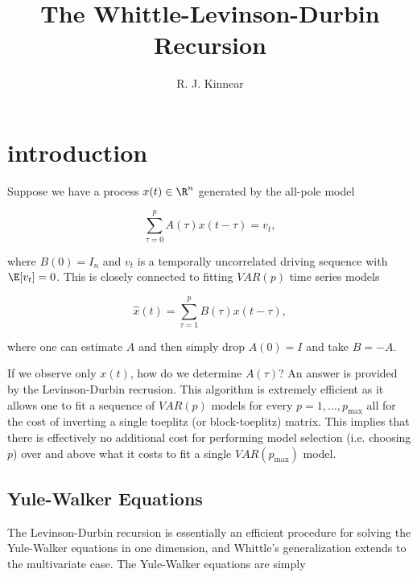 \documentclass[12pt]{article}
\title{The Whittle-Levinson-Durbin Recursion}
\author{R. J. Kinnear}
\begin{document}
\maketitle


\tableofcontents
\listoftodos

\section{introduction}
Suppose we have a process $x(t) \in \R^n$ generated by the all-pole model

\begin{equation}
  \sum_{\tau = 0}^p A(\tau)x(t - \tau) = v_t,
\end{equation}

where $B(0) = I_n$ and $v_t$ is a temporally uncorrelated driving
sequence with $\E[v_t] = 0$.  This is closely connected to fitting
$VAR(p)$ time series models

\begin{equation}
  \label{eqn:var}
  \widehat{x}(t) = \sum_{\tau = 1}^p B(\tau)x(t - \tau),
\end{equation}

where one can estimate $A$ and then simply drop $A(0) = I$ and take $B = -A$.

If we observe only $x(t)$, how do we determine $A(\tau)$?  An answer
is provided by the Levinson-Durbin recrusion.  This algorithm is
extremely efficient as it allows one to fit a sequence of $VAR(p)$
models for every $p = 1, \ldots, p_{\text{max}}$ all for the cost of
inverting a single toeplitz (or block-toeplitz) matrix.  This implies
that there is effectively no additional cost for performing model
selection (i.e. choosing $p$) over and above what it costs to fit a
single $VAR(p_{\text{max}})$ model.

\subsection{Yule-Walker Equations}
The Levinson-Durbin recursion is essentially an efficient procedure
for solving the Yule-Walker equations in one dimension, and Whittle's
generalization extends to the multivariate case.  The Yule-Walker
equations are simply
\end{document}
